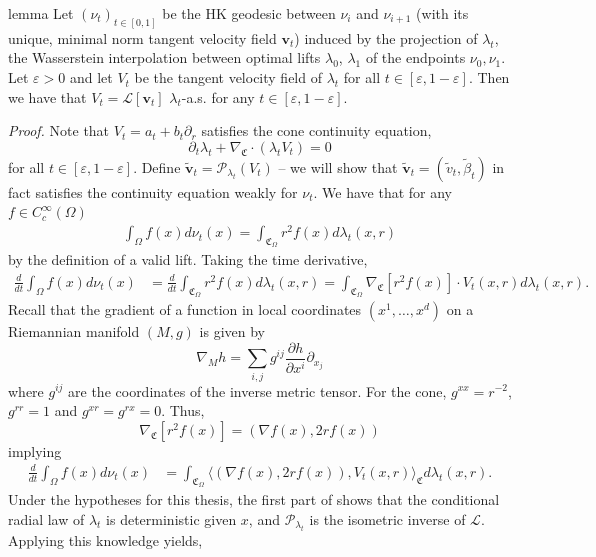 \documentclass[11pt]{article}
\newcommand{\man}{M}
\begin{document}
\begin{restatable}{lemma}{} \label{v i i+1}
    Let $(\nu_t)_{t \in [0,1]}$ be the HK geodesic between $\nu_i$ and $\nu_{i+1}$ (with its unique, minimal norm tangent velocity field $\mathbf{v}_t$) induced by the projection of $\lambda_t$, the Wasserstein interpolation between optimal lifts $\lambda_0$, $\lambda_1$ of the endpoints $\nu_0, \nu_1$. Let $\varepsilon>0$ and let $V_t$ be the tangent velocity field of $\lambda_t$ for all $t \in [\varepsilon, 1- \varepsilon]$. Then we have that $V_t = \mathcal{L}[\mathbf{v}_t]$ $
    \lambda_t$-a.s. for any $t \in [\varepsilon, 1- \varepsilon]$.
\end{restatable}
\noindent \textit{Proof.} Note that $V_t = a_t + b_t\partial_r$ satisfies the cone continuity equation,
\[\partial_t\lambda_t + \nabla_{\mathfrak{C}}\cdot(\lambda_tV_t) = 0\]
for all $t \in [\varepsilon, 1 - \varepsilon]$. Define $\tilde{\mathbf{v}}_t = \mathcal{P}_{\lambda_t}(V_t)$ -- we will show that $\tilde{\mathbf{v}}_t = (\tilde v_t, \tilde \beta_t)$ in fact satisfies the continuity equation weakly for $\nu_t$. We have that for any $f \in C^\infty_c(\Omega)$
\begin{align*}
    \int_\Omega f(x) d\nu_t(x) = \int_{\mathfrak{C}_\Omega} r^2f(x) d\lambda_t(x,r)
\end{align*}
by the definition of a valid lift. Taking the time derivative,
\begin{align*}
    \frac{d}{dt}\int_\Omega f(x) d\nu_t(x) &= \frac{d}{dt} \int_{\mathfrak{C}_{\Omega}} r^2 f(x) d\lambda_t(x,r) = \int_{\mathfrak{C}_\Omega} \nabla_{\mathfrak{C}}[r^2f(x)] \cdot V_t(x,r) d\lambda_t(x,r).
\end{align*}
Recall that the gradient of a function in local coordinates $(x^1, \dots, x^d)$ on a Riemannian manifold $(\man, g)$ is given by
\[\nabla_{\man} h = \sum_{i,j}g^{ij} \frac{\partial h}{\partial x^i}\partial_{x_j}\]
where $g^{ij}$ are the coordinates of the inverse metric tensor. For the cone, $g^{xx} = r^{-2}$, $g^{rr} = 1$ and $g^{xr} = g^{rx} = 0$.  Thus, 
\[\nabla_{\mathfrak{C}}[r^2f(x)] = (\nabla f(x), 2rf(x))\]
implying
\begin{align*}
    \frac{d}{dt}\int_\Omega f(x) d\nu_t(x) &= \int_{\mathfrak{C}_\Omega} \Big\langle (\nabla f(x), 2rf(x)),  V_t(x,r)\Big\rangle_\mathfrak{C} d\lambda_t(x,r).
\end{align*}
Under the hypotheses for this thesis, the first part of  shows that the conditional radial law of $\lambda_t$ is deterministic given $x$, and $\mathcal{P}_{\lambda_t}$ is the isometric inverse of $\mathcal{L}.$ Applying this knowledge yields,
\end{document}
